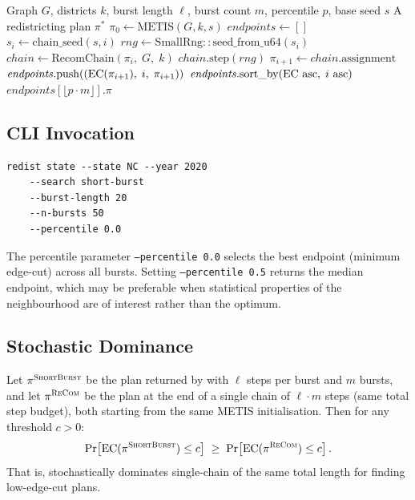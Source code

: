 \begin{algorithm}[H]
\caption{\shb{} Plan Selection}
\label{alg:short-burst}
\begin{algorithmic}[1]
\Require Graph $G$, districts $k$, burst length $\ell$, burst count $m$,
         percentile $p$, base seed $s$
\Ensure A redistricting plan $\pi^*$
\State $\pi_0 \gets \mathrm{METIS}(G, k, s)$
\State $\mathit{endpoints} \gets []$
  \State $s_i \gets \mathrm{chain\_seed}(s, i)$
  \State $\mathit{rng} \gets \mathrm{SmallRng::seed\_from\_u64}(s_i)$
  \State $\mathit{chain} \gets \mathrm{RecomChain}(\pi_i,\; G,\; k)$
    \State $\mathit{chain}.\mathrm{step}(\mathit{rng})$
  \EndFor
  \State $\pi_{i+1} \gets \mathit{chain}.\mathrm{assignment}$
  \State $\mathit{endpoints}.\mathrm{push}\!\left((\mathrm{EC}(\pi_{i+1}),\; i,\; \pi_{i+1})\right)$
\EndFor
\State $\mathit{endpoints}.\mathrm{sort\_by}\!\left(\mathrm{EC} \text{ asc},\; i \text{ asc}\right)$
\State \Return $\mathit{endpoints}[\lfloor p \cdot m \rfloor].\pi$
\end{algorithmic}
\end{algorithm}

\subsection{CLI Invocation}

\begin{verbatim}
redist state --state NC --year 2020
    --search short-burst
    --burst-length 20
    --n-bursts 50
    --percentile 0.0
\end{verbatim}

The percentile parameter \texttt{--percentile 0.0} selects the best
endpoint (minimum edge-cut) across all bursts.
Setting \texttt{--percentile 0.5} returns the median endpoint, which
may be preferable when statistical properties of the neighbourhood are
of interest rather than the optimum.

\subsection{Stochastic Dominance}

\begin{theorem}
\label{thm:dominance}
Let $\pi^{\textsc{ShortBurst}}$ be the plan returned by \shb{} with $\ell$ steps per
burst and $m$ bursts, and let $\pi^{\textsc{ReCom}}$ be the plan at the end
of a single \recom{} chain of $\ell \cdot m$ steps (same total step
budget), both starting from the same METIS initialisation.
Then for any threshold $c > 0$:
\[
  \Pr\!\left[\mathrm{EC}(\pi^{\textsc{ShortBurst}}) \leq c\right]
  \;\geq\;
  \Pr\!\left[\mathrm{EC}(\pi^{\textsc{ReCom}}) \leq c\right].
\]
That is, \shb{} stochastically dominates single-chain \recom{} of the
same total length for finding low-edge-cut plans.
\end{theorem}

